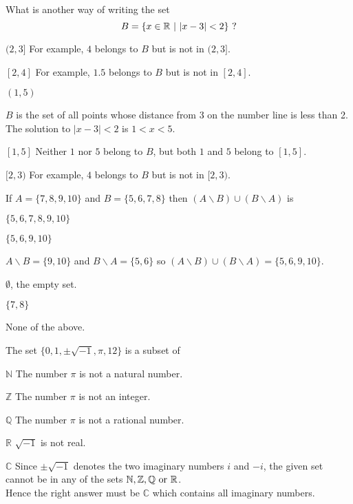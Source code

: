 \documentclass[pst2pdf]{webquiz}
\begin{document}
\begin{question}
What is another way of writing the set
\[B= \{x \in {\mathbb R}\ |\ |x-3|<2 \}\ \rm{?}\]
\begin{choice}
\incorrect $(2,3]$
\response For example, $4$ belongs to $B$ but is not in $(2,3]$.

\incorrect $[2,4]$
\response For example, $1.5$ belongs to $B$ but is not in $[2,4]$.

\correct $(1,5)$

\response $B$ is the set of all points whose distance from 3 on the
number line is less than 2. \\
The solution to $|x-3|<2$ is $1<x<5$.

\incorrect $[1,5]$
\response Neither $1$ nor $5$  belong to $B$, but both $1$ and $5$ belong to $[1,5]$.

\incorrect $[2,3)$
\response For example, $4$ belongs to $B$ but is not in $[2,3)$.

\end{choice}
\end{question}


\begin{question}
If $A=\{7,8,9,10\}$ and $B=\{5,6,7,8\}$ then $(A\backslash
B)\cup(B\backslash A)$ is
\begin{choice}
\incorrect $\{5,6,7,8,9,10\}$

\correct $\{5,6,9,10\}$

\response $A\backslash B=\{9,10\}$ and $B\backslash A=\{5,6\}$ so
$(A\backslash B)\cup(B\backslash A)=\{5,6,9,10\}$.

\incorrect $\emptyset$, the empty set.


\incorrect $\{7,8\}$

\incorrect None of the above.

\end{choice}
\end{question}

\begin{question}
The set \(\{0,1,\pm\sqrt{-1},\pi,12\}\) is a subset of
\begin{choice}
\incorrect $\mathbb N$
\response The number \(\pi\) is not a natural number.

\incorrect $\mathbb Z$
\response The number \(\pi\) is not an integer.

\incorrect $\mathbb Q$
\response The number \(\pi\) is not a rational number.

\incorrect $\mathbb R$
\response \(\sqrt{-1}\) is not real.

\correct $\mathbb C$
\response Since \(\pm\sqrt{-1}\)  denotes the two imaginary numbers  $i$ and $-i$, the given set cannot be
in any of the sets $\mathbb{N,Z,Q}\ \rm{or}\ \mathbb{R}$.  \\
Hence the
right answer must be ${\mathbb C}$ which contains all imaginary
numbers.

\end{choice}
\end{question}
\end{document}
